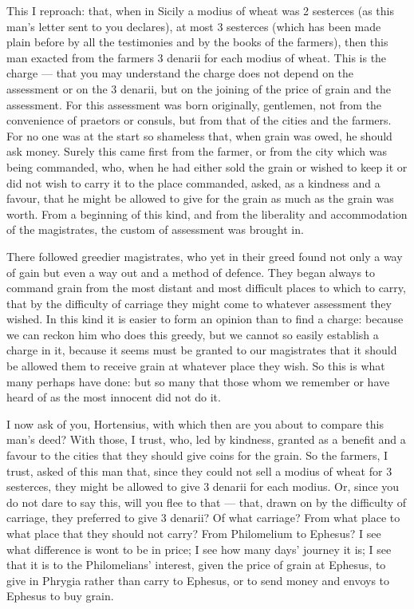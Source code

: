  This I reproach: that, when in Sicily a modius of wheat was 2 sesterces (as this man's letter sent to you declares), at most 3 sesterces (which has been made plain before by all the testimonies and by the books of the farmers), then this man exacted from the farmers 3 denarii for each modius of wheat. This is the charge --- that you may understand the charge does not depend on the assessment or on the 3 denarii, but on the joining of the price of grain and the assessment. For this assessment was born originally, gentlemen, not from the convenience of praetors or consuls, but from that of the cities and the farmers. For no one was at the start so shameless that, when grain was owed, he should ask money. Surely this came first from the farmer, or from the city which was being commanded, who, when he had either sold the grain or wished to keep it or did not wish to carry it to the place commanded, asked, as a kindness and a favour, that he might be allowed to give for the grain as much as the grain was worth. From a beginning of this kind, and from the liberality and accommodation of the magistrates, the custom of assessment was brought in.

 There followed greedier magistrates, who yet in their greed found not only a way of gain but even a way out and a method of defence. They began always to command grain from the most distant and most difficult places to which to carry, that by the difficulty of carriage they might come to whatever assessment they wished. In this kind it is easier to form an opinion than to find a charge: because we can reckon him who does this greedy, but we cannot so easily establish a charge in it, because it seems must be granted to our magistrates that it should be allowed them to receive grain at whatever place they wish. So this is what many perhaps have done: but so many that those whom we remember or have heard of as the most innocent did not do it.

 I now ask of you, Hortensius, with which then are you about to compare this man's deed? With those, I trust, who, led by kindness, granted as a benefit and a favour to the cities that they should give coins for the grain. So the farmers, I trust, asked of this man that, since they could not sell a modius of wheat for 3 sesterces, they might be allowed to give 3 denarii for each modius. Or, since you do not dare to say this, will you flee to that --- that, drawn on by the difficulty of carriage, they preferred to give 3 denarii? Of what carriage? From what place to what place that they should not carry? From Philomelium to Ephesus? I see what difference is wont to be in price; I see how many days' journey it is; I see that it is to the Philomelians' interest, given the price of grain at Ephesus, to give in Phrygia rather than carry to Ephesus, or to send money and envoys to Ephesus to buy grain.


